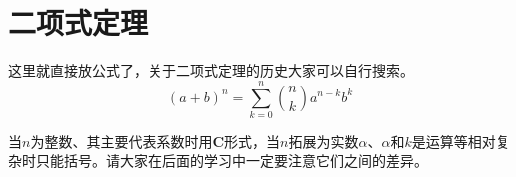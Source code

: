 \section{\textbf{二项式定理}}\label{sec:binomial}

这里就直接放公式了，关于二项式定理的历史大家可以自行搜索。
\begin{equation}
    (a+b)^n = {\textstyle \sum_{k=0}^{n}} \binom{n}{k} a^{n-k}b^k
\end{equation}

当$n$为整数、其主要代表系数时用$\textbf{C}$形式，当$n$拓展为实数$\alpha$、$\alpha$和$k$是运算等相对复杂时只能括号。请大家在后面的学习中一定要注意它们之间的差异。

